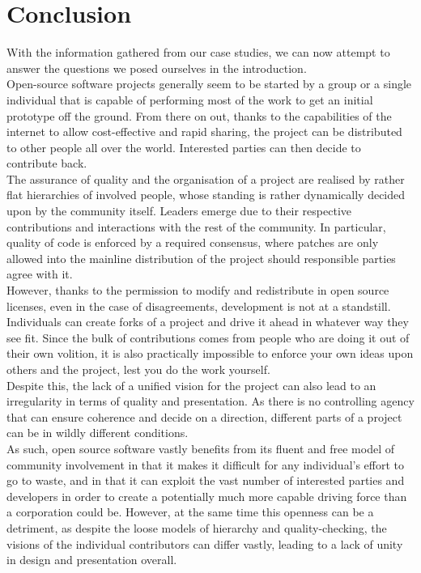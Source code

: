 \section{Conclusion}
With the information gathered from our case studies, we can now attempt to answer the questions we posed ourselves in the introduction. \\

Open-source software projects generally seem to be started by a group or a single individual that is capable of performing most of the work to get an initial prototype off the ground. From there on out, thanks to the capabilities of the internet to allow cost-effective and rapid sharing, the project can be distributed to other people all over the world. Interested parties can then decide to contribute back. \\

The assurance of quality and the organisation of a project are realised by rather flat hierarchies of involved people, whose standing is rather dynamically decided upon by the community itself. Leaders emerge due to their respective contributions and interactions with the rest of the community. In particular, quality of code is enforced by a required consensus, where patches are only allowed into the mainline distribution of the project should responsible parties agree with it. \\

However, thanks to the permission to modify and redistribute in open source licenses, even in the case of disagreements, development is not at a standstill. Individuals can create forks of a project and drive it ahead in whatever way they see fit. Since the bulk of contributions comes from people who are doing it out of their own volition, it is also practically impossible to enforce your own ideas upon others and the project, lest you do the work yourself. \\

Despite this, the lack of a unified vision for the project can also lead to an irregularity in terms of quality and presentation. As there is no controlling agency that can ensure coherence and decide on a direction, different parts of a project can be in wildly different conditions. \\

As such, open source software vastly benefits from its fluent and free model of community involvement in that it makes it difficult for any individual's effort to go to waste, and in that it can exploit the vast number of interested parties and developers in order to create a potentially much more capable driving force than a corporation could be. However, at the same time this openness can be a detriment, as despite the loose models of hierarchy and quality-checking, the visions of the individual contributors can differ vastly, leading to a lack of unity in design and presentation overall.

